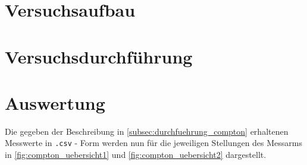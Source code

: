 \documentclass[ngerman]{scrartcl}
\begin{document}
\section{Versuchsaufbau}
\label{sec:aufbau}



\section{Versuchsdurchführung}
\label{sec:durchfuehrung}

\section{Auswertung}
\label{sec:auswertung}
Die gegeben der Beschreibung in \ref{subsec:durchfuehrung_compton} erhaltenen Messwerte in \texttt{.csv} - Form werden nun für die jeweiligen Stellungen des Messarms in \autoref{fig:compton_uebersicht1} und \autoref{fig:compton_uebersicht2} dargestellt.
\end{document}
